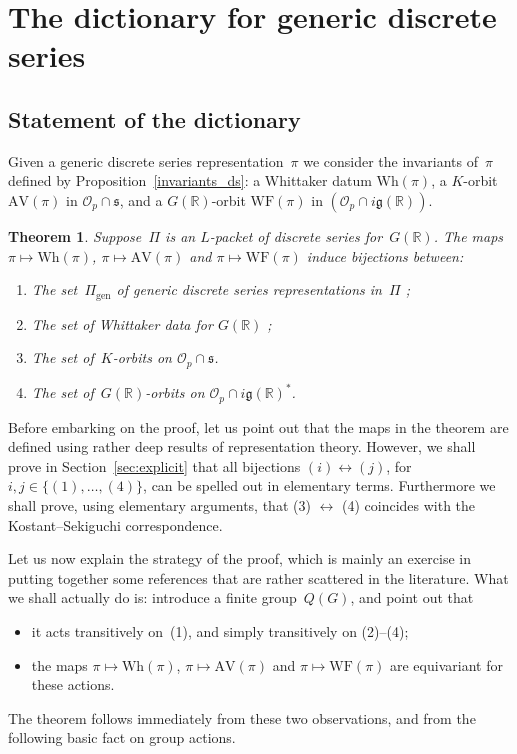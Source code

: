 \documentclass[10pt,leqno]{article}
\newtheorem{theorem}[equation]{Theorem}
\newcommand{\R}{\mathbb R}
\newcommand{\g}{\mathfrak g}
\newcommand{\s}{\mathfrak s}
\newcommand{\AV}{\mathrm{AV}}
\newcommand{\Wh}{\mathrm{Wh}}
\newcommand{\WF}{\mathrm{WF}}
\begin{document}
\section{The dictionary for generic discrete series}


\subsection{Statement of the dictionary}  



Given a generic discrete series representation~$\pi$ we consider the invariants of~$\pi$ defined by Proposition~\ref{invariants_ds}: a Whittaker datum  $\Wh(\pi)$, a $K$-orbit $\AV(\pi)$ in $\mathcal{O}_p \cap \mathfrak{s}$, and a $G(\R)$-orbit $\WF(\pi)$ in $(\mathcal{O}_p \cap  i \g(\R))$.


\begin{theorem} \label{th:main} Suppose~$\Pi$ is an $L$-packet of discrete series for~$G(\R)$. 
The maps $\pi \mapsto \Wh(\pi)$, $\pi \mapsto \AV(\pi)$ and $\pi\mapsto \WF(\pi)$ induce bijections between:
\begin{enumerate}
\item[(1)] The set~$\Pi_{\mathrm{gen}}$ of generic discrete series representations in~$\Pi$ ;
\item[(2)] The set of Whittaker data for $G(\R)$ ;
\item[(3)] The set of~$K$-orbits on $\mathcal{O}_p \cap \s$.
\item[(4)] The set of~$G(\R)$-orbits on $\mathcal{O}_p \cap  i \g(\R)^*$.
\end{enumerate}
\end{theorem}

Before embarking on the proof, let us point out that the maps in the theorem are defined using rather deep results of representation theory. However, we shall prove in Section~\ref{sec:explicit} that all bijections $(i) \leftrightarrow (j)$, for $i,j \in \{(1), \dots, (4)\}$, can be spelled out in elementary terms. Furthermore we shall prove, using elementary arguments, that (3) $\leftrightarrow$ (4) coincides with the Kostant--Sekiguchi correspondence.  



Let us now explain the strategy of the proof, which is mainly an exercise in putting together some references that are rather scattered in the literature. What we shall actually do is: introduce a finite group~$Q(G)$, and point out that 
\begin{itemize}
\item[(i)] it acts transitively on~(1), and simply transitively on (2)--(4);
\item[(ii)] the maps $\pi \mapsto \Wh(\pi)$, $\pi \mapsto \AV(\pi)$ and $\pi\mapsto \WF(\pi)$  are equivariant for these actions.
\end{itemize}
The theorem follows immediately from these two observations, and from the following basic fact on group actions.
\end{document}
